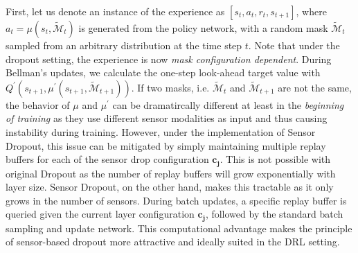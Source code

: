 \documentclass[../thesis.tex]{subfiles}
\begin{document}
First, let us denote an instance of the experience as $[s_{t}, a_{t} , r_{t}, s_{t+1}]$, where $a_{t} = \mu(s_t, \mathcal{\tilde{M}}_{t}) $ is generated from the policy network, with a random mask $\mathcal{\tilde{M}}_{t}$ sampled from an arbitrary distribution at the time step $t$. Note that under the dropout setting, the experience is now \textit{mask configuration dependent}. During Bellman's updates, we calculate the one-step look-ahead target value with $Q^{'}(s_{t+1}, \mu^{'}(s_{t+1},\mathcal{\tilde{M}}_{t+1}))$. 
If two masks, i.e. $\mathcal{\tilde{M}}_{t}$ and $\mathcal{\tilde{M}}_{t+1}$ are not the same, the behavior of $\mu$ and $\mu^{'}$ can be dramatircally different at least in the \textit{beginning of training} as they use different sensor modalities as input and thus causing instability during training.
However, under the implementation of Sensor Dropout, this issue can be mitigated by simply maintaining multiple replay buffers for each of the sensor drop configuration $\mathbf{c_j}$. This is not possible with original Dropout as the number of replay buffers will grow exponentially with layer size. Sensor Dropout, on the other hand, makes this tractable as it only grows in the number of sensors. During batch updates, a specific replay buffer is queried given the current layer configuration $\mathbf{c_j}$, followed by the standard batch sampling and update network. This computational advantage makes the principle of sensor-based dropout more attractive and ideally suited in the DRL setting. 

\end{document}
